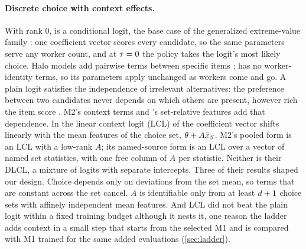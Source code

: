 \paragraph{Discrete choice with context effects.}
With rank 0, \lc{} is a conditional logit, the base case of the generalized extreme-value family
\citep{train2009gev}: one coefficient vector scores every candidate, so the same parameters serve any worker count, and at $\tau = 0$
the policy takes the logit's most likely choice.
Halo models add pairwise terms between specific items \citep{maragheh2018halo}; \lc{} has no
worker-identity terms, so its parameters apply unchanged as workers come and go.
A plain logit satisfies the independence of irrelevant alternatives: the preference between two
candidates never depends on which others are present, however rich the item score
\citep{rosenfeld2020setdependent}. M2's context terms and 's set-relative features add
that dependence.
In the linear context logit (LCL) of \citet{tomlinson2021lcl} the coefficient vector shifts
linearly with the mean features of the choice set, $\theta + A\bar{x}_{S}$. M2's pooled form is an LCL
with a low-rank $A$; its named-source form is an LCL over a vector of named set statistics, with
one free column of $A$ per statistic. Neither is their DLCL, a mixture of logits with separate
intercepts. Three of their results shaped our design. Choice depends only on deviations from the set mean, so terms that are constant across
the set cancel. $A$ is identifiable only from at least $d + 1$ choice sets with affinely
independent mean features. And LCL did not beat the plain logit within a fixed training budget
although it nests it, one reason the ladder adds context in a small step that starts from the
selected M1 and is compared with M1 trained for the same added evaluations (\cref{sec:ladder}).

